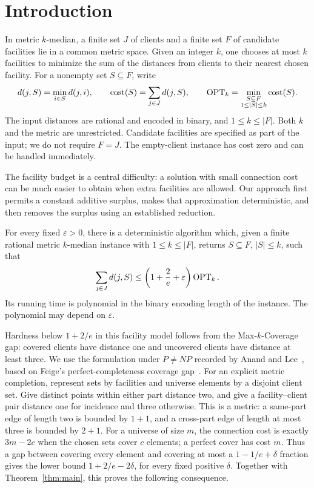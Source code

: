 \section{Introduction}\label{sec:introduction}

In metric \(k\)-median, a finite set \(J\) of clients and a finite set \(F\)
of candidate facilities lie in a common metric space. Given an integer \(k\),
one chooses at most \(k\) facilities to minimize the sum of the distances
from clients to their nearest chosen facility. For a nonempty set
\(S\subseteq F\), write
\[
 d(j,S)=\min_{i\in S}d(j,i),\qquad
 \operatorname{cost}(S)=\sum_{j\in J}d(j,S),\qquad
 \operatorname{OPT}_k=\min_{\substack{S\subseteq F\\1\le|S|\le k}}\operatorname{cost}(S).
\]
The input distances are rational and encoded in binary, and
\(1\le k\le |F|\). Both \(k\) and the metric are unrestricted.
Candidate facilities are specified as part of the input; we do not
require \(F=J\). The empty-client instance has cost zero and can be
handled immediately.

The facility budget is a central difficulty: a solution with small
connection cost can be much easier to obtain when extra facilities are
allowed. Our approach first permits a constant additive surplus, makes
that approximation deterministic, and then removes the surplus using an
established reduction.

\begin{theorem}\label{thm:main}
For every fixed \(\varepsilon>0\), there is a deterministic algorithm which,
given a finite rational metric \(k\)-median instance with \(1\le k\le |F|\),
returns \(S\subseteq F\), \(|S|\le k\), such that
\[
 \sum_{j\in J}d(j,S)\le
 \left(1+\frac2e+\varepsilon\right)\operatorname{OPT}_k.
\]
Its running time is polynomial in the binary encoding length of the instance.
The polynomial may depend on \(\varepsilon\).
\end{theorem}

Hardness below \(1+2/e\) in this facility model follows from the
Max-\(k\)-Coverage gap: covered clients have distance one and uncovered
clients have distance at least three. We use the formulation under \(P\ne NP\)
recorded by Anand and Lee~\cite[Sections~1 and~1.1]{AnandLee2024}, based on
Feige's perfect-completeness coverage gap~\cite[Theorem~5.3]{Feige1998}.
For an explicit metric completion, represent sets by facilities and
universe elements by a disjoint client set. Give distinct points within
either part distance two, and give a facility--client pair distance one
for incidence and three otherwise. This is a metric: a same-part edge
of length two is bounded by \(1+1\), and a cross-part edge of length at
most three is bounded by \(2+1\). For a universe of size \(m\), the
connection cost is exactly \(3m-2c\) when the chosen sets cover \(c\)
elements; a perfect cover has cost \(m\). Thus a gap between
covering every element and covering at most a
\(1-1/e+\delta\) fraction gives the lower bound
\(1+2/e-2\delta\), for every fixed positive \(\delta\).
Together with Theorem~\ref{thm:main},
this proves the following consequence.

